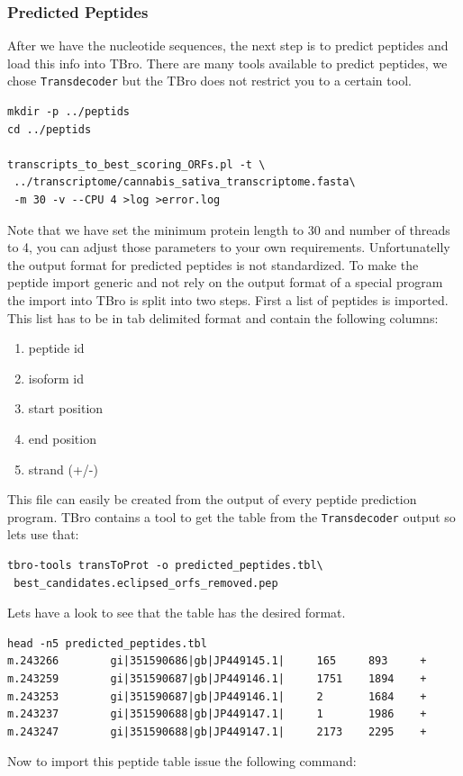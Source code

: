 \documentclass[english]{scrartcl}
\begin{document}
\subsubsection{Predicted Peptides}
After we have the nucleotide sequences, the next step is to predict peptides and
load this info into TBro. There are many tools available to predict peptides, we
chose \texttt{Transdecoder} but the TBro does not restrict you to a certain
tool.
\begin{lstlisting}[style=Bash]
mkdir -p ../peptids
cd ../peptids

transcripts_to_best_scoring_ORFs.pl -t \
 ../transcriptome/cannabis_sativa_transcriptome.fasta\
 -m 30 -v --CPU 4 >log >error.log
\end{lstlisting}
Note that we have set the minimum protein length to 30 and number of threads to
4, you can adjust those parameters to your own requirements. Unfortunatelly the
output format for predicted peptides is not standardized. To make the peptide
import generic and not rely on the output format of a special program the import
into TBro is split into two steps. First a list of peptides is imported. This
list has to be in tab delimited format and contain the following columns:
\begin{enumerate}
  \item peptide id
  \item isoform id
  \item start position
  \item end position
  \item strand (+/-)
\end{enumerate}
This file can easily be created from the output of every peptide prediction
program. TBro contains a tool to get the table from the \texttt{Transdecoder}
output so lets use that:
\begin{lstlisting}
tbro-tools transToProt -o predicted_peptides.tbl\
 best_candidates.eclipsed_orfs_removed.pep
\end{lstlisting}
Lets have a look to see that the table has the desired format.
\begin{lstlisting}
head -n5 predicted_peptides.tbl
m.243266        gi|351590686|gb|JP449145.1|     165     893     +
m.243259        gi|351590687|gb|JP449146.1|     1751    1894    +
m.243253        gi|351590687|gb|JP449146.1|     2       1684    +
m.243237        gi|351590688|gb|JP449147.1|     1       1986    +
m.243247        gi|351590688|gb|JP449147.1|     2173    2295    +
\end{lstlisting}
Now to import this peptide table issue the following command:
\end{document}
